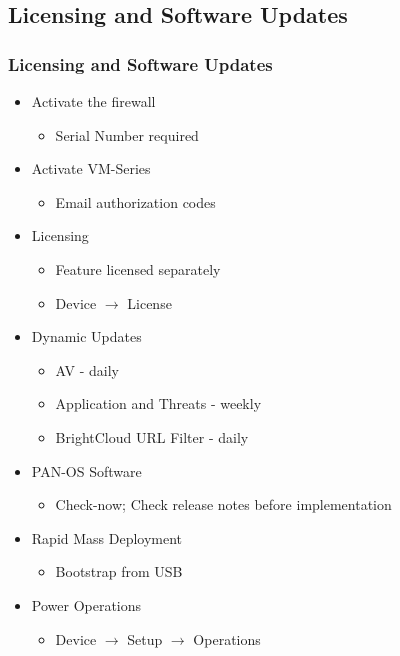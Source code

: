 \subsection{Licensing and Software Updates}
\subsubsection{Licensing and Software Updates}
    \begin{itemize}
        \item Activate the firewall
            \begin{itemize}
                \item Serial Number required
            \end{itemize}
        \item Activate VM-Series
            \begin{itemize}
                \item Email authorization codes
            \end{itemize}
        \item Licensing
            \begin{itemize}
                \item Feature licensed separately
                \item Device $\rightarrow$ License
            \end{itemize}
        \item Dynamic Updates
            \begin{itemize}
                \item AV - daily
                \item Application and Threats - weekly
                \item BrightCloud URL Filter - daily
            \end{itemize}
        \item PAN-OS Software
            \begin{itemize}
                \item Check-now; Check release notes before implementation
            \end{itemize}
        \item Rapid Mass Deployment
            \begin{itemize}
                \item Bootstrap from USB
            \end{itemize}
        \item Power Operations
            \begin{itemize}
                \item Device $\rightarrow$ Setup $\rightarrow$ Operations
            \end{itemize}
    \end{itemize}

